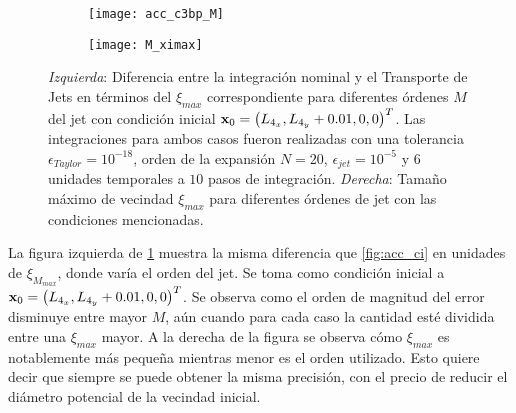 \begin{figure}[h!]
\centering
\begin{subfigure}{0.49\textwidth}
	\centering
	\texttt{[image: acc\_c3bp\_M]}
\end{subfigure}
%
\begin{subfigure}{0.49\textwidth}
	\centering
	\texttt{[image: M\_ximax]}
\end{subfigure}
\caption{ \textit{Izquierda}: Diferencia entre la integración nominal y el Transporte de Jets en términos del $\xi_{max}$ correspondiente para diferentes órdenes $M$ del jet con condición inicial $\mathbf{x}_0 =\left(L_{4_x}, L_{4_y} + 0.01, 0, 0 \right)^T$. Las integraciones para ambos casos fueron realizadas con una tolerancia $\epsilon_{Taylor} = 10^{-18}$, orden de la expansión $N=20$, $\epsilon_{jet} = 10^{-5}$ y $6$ unidades temporales a $10$ pasos de integración. \textit{Derecha}: Tamaño máximo de vecindad $\xi_{max}$ para diferentes órdenes de jet con las condiciones mencionadas.}
\label{fig:acc_M}
\end{figure}

La figura izquierda de \ref{fig:acc_M} muestra la misma diferencia que \ref{fig:acc_ci} en unidades de $\xi_{M_{max}}$, donde varía el orden del jet. Se toma como condición inicial a $\mathbf{x}_0 =\left(L_{4_x}, L_{4_y} + 0.01, 0, 0 \right)^T$.  Se observa como el orden de magnitud del error disminuye entre mayor $M$, aún cuando para cada caso la cantidad esté dividida entre una $\xi_{max}$ mayor. A la derecha de la figura se observa cómo $\xi_{max}$ es notablemente más pequeña mientras menor es el orden utilizado. Esto quiere decir que siempre se puede obtener la misma precisión, con el precio de reducir el diámetro potencial de la vecindad inicial.

%
 
